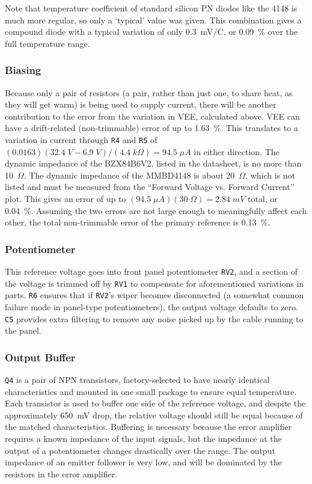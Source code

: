 \begin{multicols}{2}
Note that temperature coefficient of standard silicon PN diodes like the 4148
is much more regular, so only a `typical' value was given. This combination
gives a compound diode with a typical variation of only 0.3~mV/\dg C, or
0.09~\% over the full temperature range.

\subsubsection{Biasing}
Because only a pair of resistors (a pair, rather than just one, to share heat,
as they will get warm) is being used to supply current, there will be another
contribution to the error from the variation in VEE, calculated above. VEE can
have a drift-related (non-trimmable) error of up to 1.63~\%. This translates to
a variation in current through \texttt{R4} and \texttt{R5} of
$(0.0163)(32.4\;V-6.9\;V)/(4.4\;k\Omega) = 94.5\;\mu A$ in
either direction. The dynamic impedance of the BZX84B6V2, listed in the
datasheet, is no more than 10~$\Omega$. The dynamic impedance of the MMBD4148
is about 20~$\Omega$, which is not listed and must be measured from the
``Forward Voltage vs. Forward Current'' plot. This gives an error of up to
$(94.5\;\mu A)(30\;\Omega) = 2.84\;mV$ total, or 0.04~\%. Assuming the two
errors are not large enough to meaningfully affect each other, the total
non-trimmable error of the primary
reference is 0.13~\%.

\subsubsection{Potentiometer}
This reference voltage goes into front panel potentiometer \texttt{RV2}, and
a section of the voltage is trimmed off by \texttt{RV1} to compensate for
aforementioned variations in parts. \texttt{R6} ensures that if \texttt{RV2}'s
wiper becomes disconnected (a somewhat common failure mode in panel-type
potentiometers), the output voltage defaults to zero. \texttt{C5} provides
extra filtering to remove any noise picked up by the cable running to the
panel.

\subsubsection{Output Buffer}
\texttt{Q4} is a pair of NPN transistors, factory-selected to have nearly
identical
characteristics and mounted in one small package to ensure equal temperature.
Each transistor is used to buffer one side of the reference voltage, and
despite the approximately 650~mV drop, the relative voltage should still be
equal because of the matched characteristics. Buffering is necessary because
the error amplifier requires a known impedance of the input signals, but the
impedance at the output of a potentiometer changes drastically over the
range. The output impedance of an emitter follower is very low, and will be
dominated by the resistors in the error amplifier.


\end{multicols}
